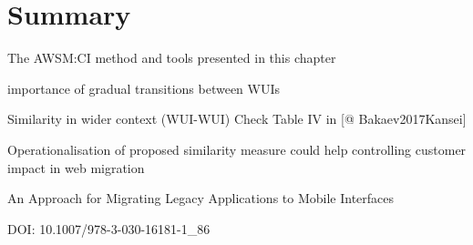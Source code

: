 \hypertarget{summary}{%
\section{Summary}\label{summary}}

The AWSM:CI method and tools presented in this chapter

\autocite{Donati2019} importance of gradual transitions between WUIs

Similarity in wider context (WUI-WUI) Check Table IV in {[}@ Bakaev2017Kansei{]}

Operationalisation of proposed similarity measure could help controlling customer impact in web migration

An Approach for Migrating Legacy Applications to Mobile Interfaces

DOI: 10.1007/978-3-030-16181-1\_86
